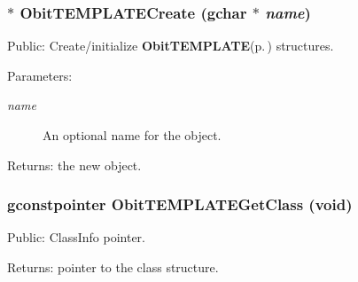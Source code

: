 \subsubsection{$\ast$ Obit\-TEMPLATECreate (gchar $\ast$ {\em name})}\label{ObitTEMPLATE_8h_a6}


Public: Create/initialize {\bf Obit\-TEMPLATE}{\rm (p.\,\pageref{structObitTEMPLATE})} structures. 

\begin{Desc}
\item[Parameters:]
\begin{description}
\item[{\em name}]An optional name for the object. \end{description}
\end{Desc}
\begin{Desc}
\item[Returns:]the new object. \end{Desc}
\subsubsection{\setlength{\rightskip}{0pt plus 5cm}gconstpointer Obit\-TEMPLATEGet\-Class (void)}\label{ObitTEMPLATE_8h_a7}


Public: Class\-Info pointer. 

\begin{Desc}
\item[Returns:]pointer to the class structure. \end{Desc}
